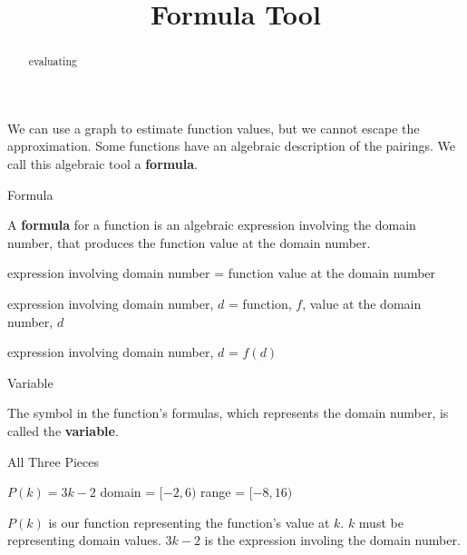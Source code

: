 \documentclass{ximera}
\title{Formula Tool}
\begin{document}
\begin{abstract}
evaluating
\end{abstract}
\maketitle



We can use a graph to estimate function values, but we cannot escape the approximation.  Some functions have an algebraic description of the pairings.  We call this algebraic tool a \textbf{formula}.



\begin{definition}  Formula


A \textbf{formula} for a function is an algebraic expression involving the domain number, that produces the function value at the domain number.
\end{definition}




\begin{center}
expression involving domain number = function value at the domain number 
\end{center}


\begin{center}
expression involving domain number, $d$ = function, $f$, value at the domain number, $d$
\end{center}


\begin{center}
expression involving domain number, $d$ = $f(d)$
\end{center}




\begin{definition}  Variable


The symbol in the function's formulas, which represents the domain number, is called the \textbf{variable}.
\end{definition}







\begin{example}   All Three Pieces

$P(k) = 3k - 2$
domain = $[-2, 6)$
range = $[-8, 16)$


$P(k)$ is our function representing the function's value at $k$.  $k$ must be representing domain values. $3k - 2$ is the expression involing the domain number.

\end{example}
\end{document}
